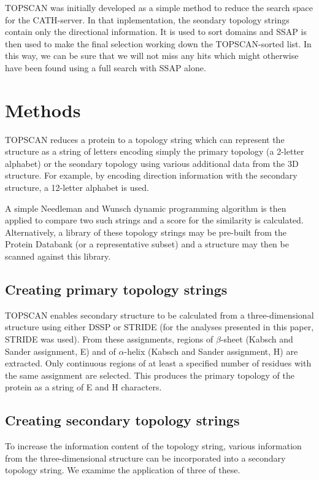 \documentclass{article}
\begin{document}
TOPSCAN was initially developed as a simple method to reduce the
search space for the CATH-server. In that inplementation, the seondary
topology strings contain only the directional information.  It is used
to sort domains and SSAP is then used to make the final selection
working down the TOPSCAN-sorted list. In this way, we can be sure that
we will not miss any hits which might otherwise have been found using
a full search with SSAP alone.


\section{Methods}
TOPSCAN reduces a protein to a topology string which can represent the
structure as a string of letters encoding simply the primary topology
(a 2-letter alphabet) or the seondary topology using various
additional data from the 3D structure. For example, by encoding
direction information with the secondary structure, a 12-letter
alphabet is used.

A simple Needleman and Wunsch dynamic programming algorithm is then
applied to compare two such strings and a score for the similarity is
calculated. Alternatively, a library of these topology strings may be
pre-built from the Protein Databank (or a representative subset) and a
structure may then be scanned against this library.

\subsection{Creating primary topology strings}
TOPSCAN enables secondary structure to be calculated from a
three-dimensional structure using either DSSP or STRIDE (for the
analyses presented in this paper, STRIDE was used).  From these
assignments, regions of $\beta$-sheet (Kabsch and Sander assignment,
E) and of $\alpha$-helix (Kabsch and Sander assignment, H) are
extracted. Only continuous regions of at least a specified number of
residues with the same assignment are selected.  This produces the
primary topology of the protein as a string of E and H characters.

\subsection{Creating secondary topology strings}
To increase the information content of the topology string, various
information from the three-dimensional structure can be incorporated
into a secondary topology string. We examime the application of three
of these.
\end{document}
